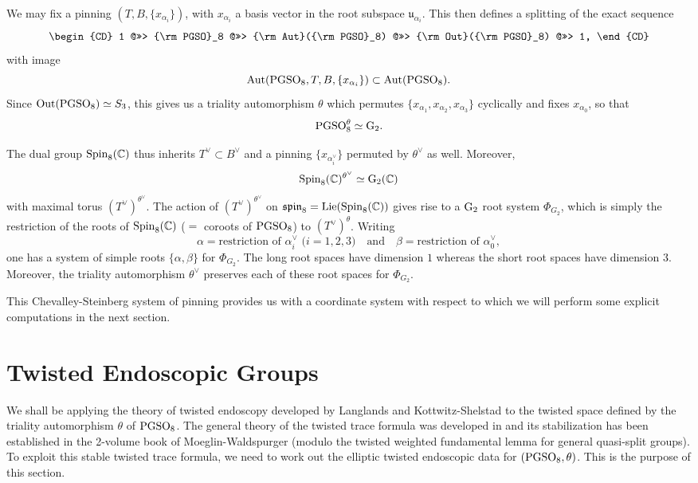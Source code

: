 \documentclass[11pt]{amsart}
\theoremstyle{plain}
\numberwithin{equation}{section}
\newcommand{\C}{\mathbb C}
\def\Aut{{\rm Aut}}
\def\PGSO{{\rm PGSO}}
\def\Spin{{\rm Spin}}
\def\Spin{{\rm Spin}}
\def\C{{\bf C}}
\def\C{{\mathbb C}}
\begin{document}
    We may fix a pinning $(T, B,  \{x_{\alpha_i} \} )$, with $x_{\alpha_i}$ a basis vector in the root subspace $\mathfrak{u}_{\alpha_i}$.  This then defines a splitting of the exact sequence
   \[  \begin{CD}
   1 @>>> \PGSO_8 @>>> \Aut(\PGSO_8) @>>> {\rm Out}(\PGSO_8) @>>> 1, \end{CD} \]
   with image 
   \[ \Aut(\PGSO_8, T,B, \{ x_{\alpha_i} \}) \subset \Aut(\PGSO_8). \]
   Since ${\rm Out}(\PGSO_8) \simeq S_3$, this gives us a  triality automorphism $\theta$ which   permutes $\{x_{\alpha_1}, x_{\alpha_2}, x_{\alpha_3}\}$ cyclically and fixes $x_{\alpha_0}$, so that
  \[  \PGSO_8^{\theta} \simeq {\rm G}_2. \]
 
 \vskip 5pt
 
   The dual group $\Spin_8(\C)$ thus inherits $T^{\vee} \subset B^{\vee}$ and a pinning $\{ x_{\alpha_i^{\vee}} \}$ permuted by $\theta^{\vee}$ as well. 
   Moreover, 
   \[  \Spin_8(\C)^{\theta^{\vee}} \simeq {\rm G}_2(\C) \]
with maximal torus $(T^{\vee})^{\theta^{\vee}}$.  The action of $(T^{\vee})^{\theta^{\vee}}$ on $\mathfrak{spin}_8 = {\rm Lie}(\Spin_8(\C))$ gives rise to a ${\rm G}_2$ root system $\Phi_{G_2}$, which is simply the restriction of the roots of $\Spin_8(\C)$ ($=$ coroots of $\PGSO_8$) to $(T^{\vee})^{\theta}$.  Writing
\[  \alpha = \text{restriction of $\alpha_i^{\vee}$  ($i=1,2,3$)} \quad \text{and} \quad \beta = \text{restriction of $\alpha_0^{\vee}$}, \]
one has a system of simple roots $\{\alpha, \beta\}$ for $\Phi_{G_2}$. The long root spaces have dimension $1$ whereas the short root spaces have dimension $3$. 
Moreover, the triality automorphism $\theta^{\vee}$ preserves each of these root spaces for $\Phi_{G_2}$.

   
   \vskip 5pt
   
 This Chevalley-Steinberg system of pinning provides us with a coordinate system with respect to which we will perform some explicit computations in the next section.
  
 \vskip 5pt

\vskip 10pt

 
 \section{\bf Twisted Endoscopic Groups} \label{S:endoscopic}
 We 
 shall be applying the theory of twisted endoscopy developed by Langlands and Kottwitz-Shelstad \cite{KSh}  to the twisted space defined by the triality automorphism $\theta$ 
 of $\PGSO_8$.  The general theory of the twisted trace formula was developed in \cite{LW} and its stabilization 
  has been established in the  2-volume book  \cite{MW1, MW2} of Moeglin-Waldspurger (modulo the twisted weighted fundamental lemma for general quasi-split groups). To exploit this stable twisted trace formula, we need to work out the elliptic twisted endoscopic data for $(\PGSO_8, \theta)$. This is the purpose of this section. 
\end{document}
